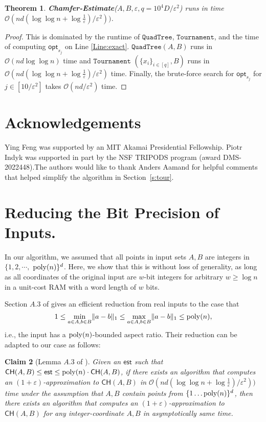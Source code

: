 \documentclass[11pt]{article}
\newcommand{\eps}{\varepsilon}
\theoremstyle{plain}
\newtheorem{theorem}{Theorem}[section]
\newtheorem{clm}[theorem]{Claim}
\newcommand{\OO}{\mathcal{O}}
\newcommand{\opt}{\mathsf{opt}}
\newcommand{\Tournament}{\texttt{Tournament}}
\newcommand{\QuadTree}{\texttt{QuadTree}} \usepackage{microtype}
\begin{document}
\begin{theorem}
    {\normalfont \textbf{Chamfer-Estimate}($A, B, \eps, q = 10^4{{D}}/\eps^2$)} runs in time $\OO(nd(\log\log n + \log \frac{1}{\eps})/\eps^2))$.
\end{theorem}

\begin{proof}
    This is dominated by the runtime of $\QuadTree$, $\Tournament$, and the time of computing $\opt_{s_j}$ on Line \ref{Line:exact}. $\QuadTree(A, B)$ runs in $\OO(nd \log \log n)$ time and $\Tournament$ $(\{x_i\}_{i \in [q]}, B)$ runs in $\OO(n d(\log\log n+\log\frac{1}{\eps})/\eps^2)$ time. Finally, the brute-force search for $\opt_{s_j}$ for $j \in [10/\eps^2]$ takes $\OO(nd/\eps^2)$ time.
\end{proof} 


\nocite{langley00}


\section*{Acknowledgements}
Ying Feng was supported by an MIT Akamai Presidential Fellowship. Piotr Indyk was supported in part by the NSF TRIPODS program (award DMS-2022448).The authors would like to thank Anders Aamand for helpful comments that helped simplify the algorithm in Section~\ref{s:tour}.

\def\shortbib{0}






\appendix

\section{Reducing the Bit Precision of Inputs.}

In our algorithm, we assumed that all points in input sets $A, B$ are integers in $\{1,2 , \cdots, $ ${\rm poly}(n)\}^d$. Here, we show that this is without loss of generality, as long as all coordinates of the original input are $w$-bit integers for arbitrary $w \geq \log n$ in a unit-cost RAM with a word length
of $w$ bits.

Section $A.3$ of \cite{BIJ24} gives an efficient reduction from real inputs to the case that \[1 \leq \min_{a \in A, b \in B} \lVert a - b\rVert_1  \leq \max_{a \in A, b \in B} \lVert a - b\rVert_1 \leq {\rm poly}(n),\] i.e., the input has a ${\rm poly}(n)$-bounded aspect ratio. Their reduction can be adapted to our case as follows: 


\begin{clm}[Lemma $A.3$ of \cite{BIJ24}]
    Given an $\mathsf{est}$ such that $\mathsf{CH}(A, B) \leq  \mathsf{est} \leq {\rm poly}(n) \cdot \mathsf{CH}(A, B)$, if there exists an algorithm that computes an $(1+\eps)$-approximation to $\mathsf{CH}(A, B)$ in $\OO(nd(\log\log n+\log\frac{1}{\eps})/\eps^2))$ time under the assumption that $A, B$ contain points from 
    $\{1 \ldots \mbox{{\rm poly}}(n) \}^d$, then there exists an algorithm that computes an $(1+\eps)$-approximation to $\mathsf{CH}(A, B)$ for any 
 integer-coordinate $A, B$ in asymptotically same time.
\end{clm}
\end{document}
